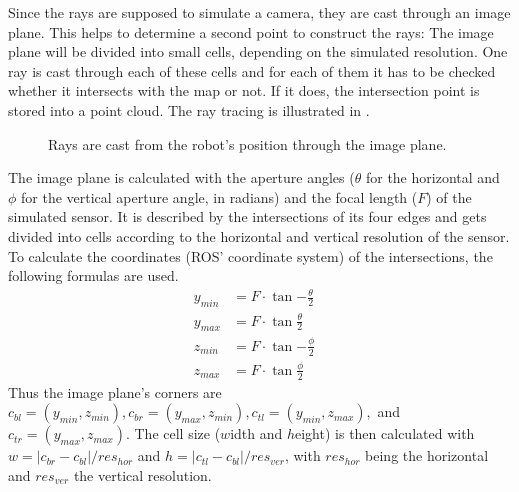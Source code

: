 \documentclass[Thesis.tex]{subfiles}
\begin{document}
Since the rays are supposed to simulate a camera, they are cast through an image plane. This helps to determine a second point to construct the rays: The image plane will be divided into small cells, depending on the simulated resolution. One ray is cast through each of these cells and for each of them it has to be checked whether it intersects with the map or not. If it does, the intersection point is stored into a point cloud. The ray tracing is illustrated in .
%
\begin{figure}[!htp]
  \caption{Rays are cast from the robot's position through the image plane.}
  \label{fig:raytrace_scheme}
\end{figure}
%
The image plane is calculated with the aperture angles ($\theta$ for the horizontal and $\phi$ for the vertical aperture angle, in radians) and the focal length ($F$) of the simulated sensor. It is described by the intersections of its four edges and gets divided into cells according to the horizontal and vertical resolution of the sensor. To calculate the coordinates (\gls{ROS}' coordinate system) of the intersections, the following formulas are used.
%
\begin{align}
y_{min} &= F \cdot \tan{-\frac{\theta}{2}} &\label{form:image_plane} \\
y_{max} &= F \cdot \tan{ \frac{\theta}{2}} &\\
z_{min} &= F \cdot \tan{-\frac{\phi}{2}} &\\
z_{max} &= F \cdot \tan{ \frac{\phi}{2}} &
\end{align}
%
Thus the image plane's corners are $c_{bl}=(y_{min}, z_{min}), c_{br}=(y_{max}, z_{min}), c_{tl}=(y_{min}, z_{max}),$ and $c_{tr}=(y_{max}, z_{max})$. The cell size ($w$idth and $h$eight) is then calculated with $w=|c_{br}-c_{bl}|/res_{hor}$ and $h=|c_{tl}-c_{bl}|/res_{ver}$, with $res_{hor}$ being the horizontal and $res_{ver}$ the vertical resolution.
\end{document}
